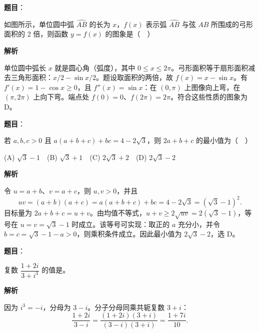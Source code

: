 \begin{answer}

\textbf{题目}：

如图所示，单位圆中弧 \(\widehat{AB}\) 的长为 \(x\)，\(f(x)\) 表示弧 \(\widehat{AB}\) 与弦 \(AB\) 所围成的弓形面积的 2 倍，则函数 \(y=f(x)\) 的图象是（　）
\nopagebreak[4]
\begin{center}\end{center}
\nopagebreak[4]
\textbf{解析}

单位圆中弧长 \(x\) 就是圆心角（弧度），其中 \(0\le x\le2\pi\)。弓形面积等于扇形面积减去三角形面积：\(x/2-\sin x/2\)。题设取面积的两倍，故 \(f(x)=x-\sin x\)。有 \(f'(x)=1-\cos x\ge0\)，且 \(f''(x)=\sin x\)：在 \((0,\pi)\) 上图像向上弯，在 \((\pi,2\pi)\) 上向下弯。端点处 \(f(0)=0\)、\(f(2\pi)=2\pi\)。符合这些性质的图象为 D。


\end{answer}
\begin{answer}

\textbf{题目}：

若 \(a,b,c>0\) 且 \(a(a+b+c)+bc=4-2\sqrt3\)，则 \(2a+b+c\) 的最小值为（　）

(A) \(\sqrt3-1\)　(B) \(\sqrt3+1\)　(C) \(2\sqrt3+2\)　(D) \(2\sqrt3-2\)

\textbf{解析}

令 \(u=a+b\)、\(v=a+c\)，则 \(u,v>0\)，并且
\nopagebreak[4]
\[
uv=(a+b)(a+c)=a(a+b+c)+bc=4-2\sqrt3=(\sqrt3-1)^2.
\]
目标量为 \(2a+b+c=u+v\)。由均值不等式，\(u+v\ge2\sqrt{uv}=2(\sqrt3-1)\)，等号在 \(u=v=\sqrt3-1\) 时成立。该等号可实现：取正的 \(a\) 充分小，并令 \(b=c=\sqrt3-1-a>0\)，则乘积条件成立。因此最小值为 \(2\sqrt3-2\)，选 D。


\end{answer}
\begin{answer}

\textbf{题目}：

复数 \(\dfrac{1+2i}{3+i^3}\) 的值是\gkblank{}。

\textbf{解析}

因为 \(i^3=-i\)，分母为 \(3-i\)。分子分母同乘共轭复数 \(3+i\)：
\nopagebreak[4]
\[
\frac{1+2i}{3-i}=\frac{(1+2i)(3+i)}{(3-i)(3+i)}=\frac{1+7i}{10}.
\]


\end{answer}
